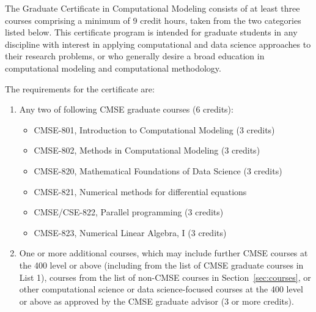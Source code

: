 The Graduate Certificate in Computational Modeling consists of at least
three courses comprising a minimum of 9 credit hours, taken from the
two categories listed below.  This certificate program is intended for
graduate students in any discipline with interest in applying
computational and data science approaches to their research problems,
or who generally desire a broad education in computational modeling
and computational methodology.  

\vspace{2mm}
\noindent
The requirements for the certificate are:

\begin{enumerate}
\item Any two of following CMSE graduate courses (6 credits):  

\begin{itemize}
    \item  CMSE-801, Introduction to Computational Modeling (3 credits)
    \item  CMSE-802, Methods in Computational Modeling (3 credits)  
    \item  CMSE-820, Mathematical Foundations of Data Science (3 credits)  
    \item  CMSE-821, Numerical methods for differential equations
    \item  CMSE/CSE-822, Parallel programming (3 credits) 
    \item  CMSE-823, Numerical Linear Algebra, I (3 credits)
\end{itemize}

\item One or more additional courses, which may include further CMSE
  courses at the 400 level or above (including from the list of 
  CMSE graduate courses in List 1), courses from the list of non-CMSE
  courses  in Section~\ref{sec:courses}, or other computational
  science or data science-focused courses at the 400 level or above as
  approved by the CMSE graduate advisor (3 or more credits).

\end{enumerate}

